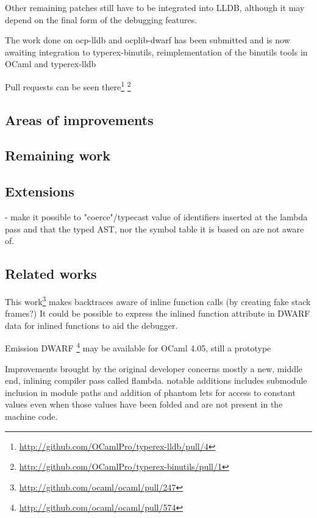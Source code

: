 Other remaining patches still have to be integrated into LLDB, although it
may depend on the final form of the debugging features.

The work done on ocp-lldb and ocplib-dwarf has been submitted and is now awaiting integration
to typerex-binutils, reimplementation of the binutils tools in OCaml and typerex-lldb

Pull requests can be seen
there\footnote{\url{http://github.com/OCamlPro/typerex-lldb/pull/4}} \footnote{\url{http://github.com/OCamlPro/typerex-binutils/pull/1}}

\subsection{Areas of improvements}


\subsection{Remaining work}


\subsection{Extensions}

- make it possible to "coerce"/typecast value of identifiers inserted at the
lambda pass and that the typed AST, nor the symbol table it is based on are not
aware of.

\subsection{Related works}

This work\footnote{\url{http://github.com/ocaml/ocaml/pull/247}} makes backtraces aware
of inline function calls (by creating fake stack frames?)
It could be possible to express the inlined function attribute in DWARF data for
inlined functions to aid the debugger.

Emission DWARF \footnote{\url{http://github.com/ocaml/ocaml/pull/574}}
may be available for OCaml 4.05, still a prototype

Improvements brought by the original developer concerns mostly a
new, middle end, inlining compiler pass called flambda.
notable additions includes submodule inclusion in module paths and addition of
phantom lets for access to constant values even when those values have been
folded and are not present in the machine code.

